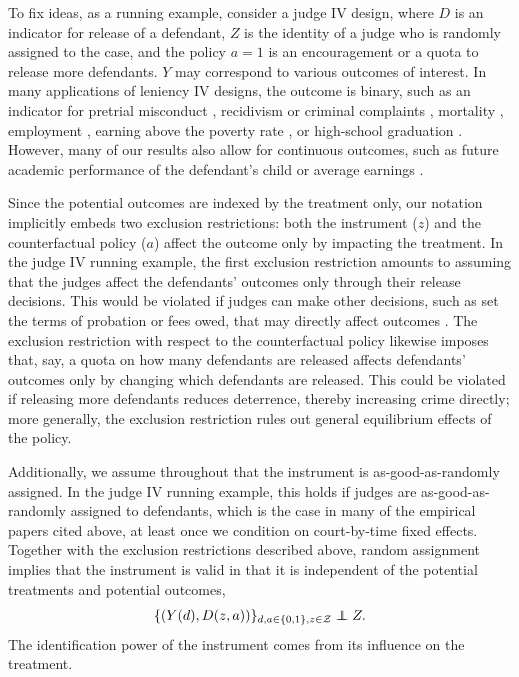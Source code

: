 \documentclass[12pt]{article}%
\theoremstyle{definition}
\newcommand\1{\operatorname{I}\indicatorfence}
\newcommand\indep{\protect\mathpalette{\protect\independenT}{\perp}}
\def\independenT#1#2{\mathrel{\rlap{$#1#2$}\mkern2mu{#1#2}}}
\begin{document}
To fix ideas, as a running example, consider a judge \ac{IV} design, where $D$
is an indicator for release of a defendant, $Z$ is the identity of
a judge who is randomly assigned to the case, and the policy $a=1$ is an
encouragement or a quota to release more defendants. $Y$ may correspond to
various outcomes of interest. In many applications of leniency IV designs, the
outcome is binary, such as an indicator for pretrial misconduct
\parencite{adh22}, recidivism or criminal complaints \parencite{adh23}, mortality \parencite{norris_effect_2024}, employment \parencite{dgy18}, earning above the poverty rate
\parencite{kling06}, or high-school graduation \parencite{AiDo15}.
However, many of our results also allow for continuous outcomes, such as future
academic performance of the defendant's child \parencite{npw21} or average
earnings \parencite{kling06}.

Since the potential outcomes are indexed by the treatment only, our notation
implicitly embeds two exclusion restrictions: both the instrument ($z$) and the
counterfactual policy ($a$) affect the outcome only by impacting the treatment. In the
judge IV running example, the first exclusion restriction amounts to assuming
that the judges affect the defendants' outcomes only through their release decisions. This would
be violated if judges can make other decisions, such as set the terms of
probation or fees owed, that may directly affect outcomes
\parencite{mueller-smith15}. The exclusion restriction with respect to the
counterfactual policy likewise imposes that, say, a quota on how many defendants
are released affects defendants' outcomes only by changing which defendants are
released. This could be violated if releasing more defendants reduces
deterrence, thereby increasing crime directly; more generally, the exclusion
restriction rules out general equilibrium effects of the policy.

Additionally, we assume throughout that the instrument is as-good-as-randomly
assigned. In the judge \ac{IV} running example, this holds if judges are as-good-as-randomly assigned to defendants, which is the case in many of the empirical
papers cited above, at least once we condition on court-by-time fixed effects.
Together with the exclusion restrictions described above, random assignment implies that the
instrument is valid in that it is independent of the potential treatments and
potential outcomes,
\begin{equation}\label{eq:valid_iv}
  \{(Y(d), D(z, a))\}_{d, a\in\{0,1\}, z\in\mathcal{Z}}\indep Z.
\end{equation}
The identification power of the instrument comes from its influence on the
treatment.
\end{document}
